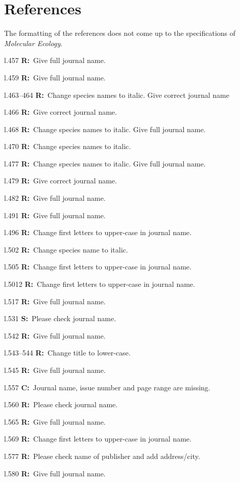 \documentclass[11pt]{article}
\newenvironment{my_description}
{\begin{description}
  \setlength{\itemsep}{2pt}
  \setlength{\parskip}{0pt}
  \setlength{\parsep}{0pt}}
{\end{description}}
\newcommand{\C}{\textbf{C:}\ }
\newcommand{\R}{\textbf{R:}\ }
\newcommand{\V}{\textbf{S:}\ }
\begin{document}
\section{References}
The formatting of the references does not come up to the specifications of \emph{Molecular Ecology}.
\begin{my_description}
	\item[l.457] \R Give full journal name.
	\item[l.459] \R Give full journal name.
	\item[l.463--464] \R Change species names to italic. Give correct journal name
	\item[l.466] \R Give correct journal name.
	\item[l.468] \R Change species names to italic. Give full journal name.
	\item[l.470] \R Change species names to italic.
	\item[l.477] \R Change species names to italic. Give full journal name.
	\item[l.479] \R Give correct journal name.
	\item[l.482] \R Give full journal name.
	\item[l.491] \R Give full journal name.
	\item[l.496] \R Change first letters to upper-case in journal name.
	\item[l.502] \R Change species name to italic.
	\item[l.505] \R Change first letters to upper-case in journal name.
	\item[l.5012] \R Change first letters to upper-case in journal name.
	\item[l.517] \R Give full journal name.
	\item[l.531] \V Please check journal name.
	\item[l.542] \R Give full journal name.
	\item[l.543--544] \R Change title to lower-case.
	\item[l.545] \R Give full journal name.
	\item[l.557] \C Journal name, issue number and page range are missing.
	\item[l.560] \R Please check journal name.
	\item[l.565] \R Give full journal name.
	\item[l.569] \R Change first letters to upper-case in journal name.
	\item[l.577] \R Please check name of publisher and add address/city.
	\item[l.580] \R Give full journal name.
	
\end{my_description}
\end{document}

